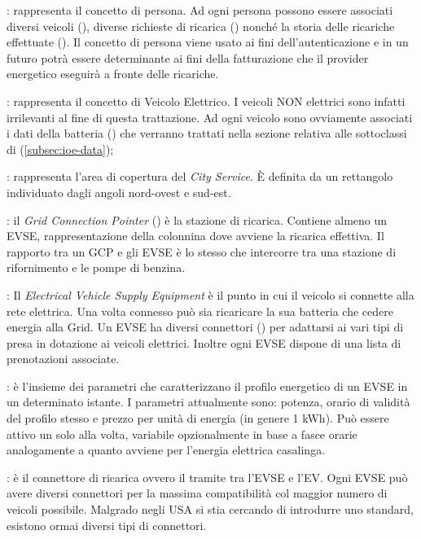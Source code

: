 \begin{description}
	\item {}: rappresenta il concetto di persona. Ad ogni persona possono essere associati diversi veicoli (), diverse richieste di ricarica () nonché la storia delle ricariche effettuate (). Il concetto di persona viene usato ai fini dell'autenticazione e in un futuro potrà essere determinante ai fini della fatturazione che il provider energetico eseguirà a fronte delle ricariche.
	\item {}: rappresenta il concetto di Veicolo Elettrico. I veicoli NON elettrici sono infatti irrilevanti al fine di questa trattazione. Ad ogni veicolo sono ovviamente associati i dati della batteria () che verranno trattati nella sezione relativa alle sottoclassi di  (\ref{subsec:ioe-data});
	\item {}: rappresenta l'area di copertura del \emph{City Service}. È definita da un rettangolo individuato dagli angoli nord-ovest e sud-est. 
	\item {}: il \emph{Grid Connection Pointer} () è la stazione di ricarica. Contiene almeno un EVSE, rappresentazione della colonnina dove avviene la ricarica effettiva. Il rapporto tra un GCP e gli EVSE è lo stesso che intercorre tra una stazione di rifornimento e le pompe di benzina. 
	\item {}: Il \emph{Electrical Vehicle Supply Equipment} è il punto in cui il veicolo si connette alla rete elettrica. Una volta connesso può sia ricaricare la sua batteria che cedere energia alla Grid. Un EVSE ha diversi connettori () per adattarsi ai vari tipi di presa in dotazione ai veicoli elettrici. Inoltre ogni EVSE dispone di una lista di prenotazioni associate.
	\item {}: è l'insieme dei parametri che caratterizzano il profilo energetico di un EVSE in un determinato istante. I parametri attualmente sono: potenza, orario di validità del profilo stesso e prezzo per unità di energia (in genere 1 kWh). Può essere attivo un solo  alla volta, variabile opzionalmente in base a fasce orarie analogamente a quanto avviene per l'energia elettrica casalinga.
	\item {}: è il connettore di ricarica ovvero il tramite tra l'EVSE e l'EV. Ogni EVSE può avere diversi connettori per la massima compatibilità col maggior numero di veicoli possibile. Malgrado negli USA si stia cercando di introdurre uno standard, esistono ormai diversi tipi di connettori. 

\end{description}
